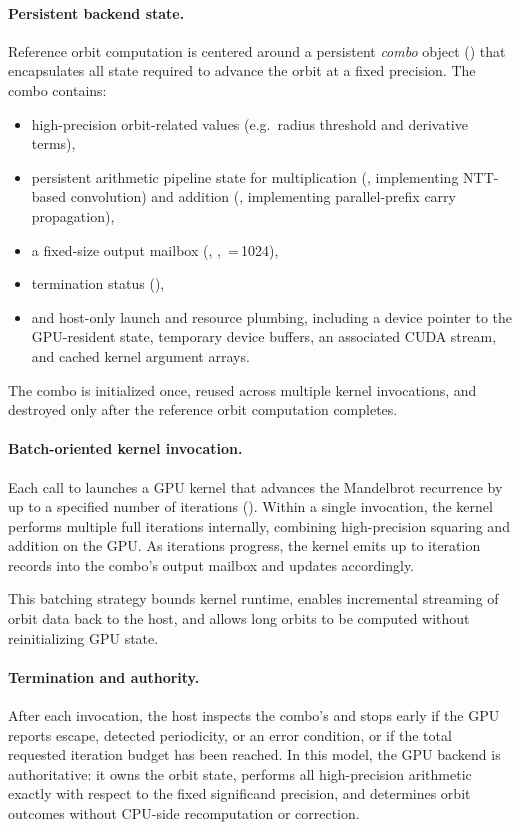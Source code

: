 \paragraph{Persistent backend state.}
Reference orbit computation is centered around a persistent \emph{combo} object
() that encapsulates all state
required to advance the orbit at a fixed precision. The combo contains:
\begin{itemize}
  \item high-precision orbit-related values (e.g.\ radius threshold and derivative terms),
  \item persistent arithmetic pipeline state for multiplication
        (, implementing NTT-based convolution) and
        addition (, implementing parallel-prefix carry
        propagation),
  \item a fixed-size output mailbox (,
        ,
        \,=\,1024),
  \item termination status (),
  \item and host-only launch and resource plumbing, including a device pointer to
        the GPU-resident state, temporary device buffers, an associated CUDA
        stream, and cached kernel argument arrays.
\end{itemize}
The combo is initialized once, reused across multiple kernel invocations, and
destroyed only after the reference orbit computation completes.

\paragraph{Batch-oriented kernel invocation.}
Each call to  launches a GPU kernel that
advances the Mandelbrot recurrence by up to a specified number of iterations
(). Within a single invocation, the kernel performs multiple
full iterations internally, combining high-precision squaring and addition on
the GPU. As iterations progress, the kernel emits up to
 iteration records into the combo’s output mailbox and
updates  accordingly.

This batching strategy bounds kernel runtime, enables incremental streaming of
orbit data back to the host, and allows long orbits to be computed without
reinitializing GPU state.

\paragraph{Termination and authority.}
After each invocation, the host inspects the combo’s 
and stops early if the GPU reports escape, detected periodicity, or an error
condition, or if the total requested iteration budget has been reached. In this
model, the GPU backend is authoritative: it owns the orbit state, performs all
high-precision arithmetic exactly with respect to the fixed significand
precision, and determines orbit outcomes without CPU-side recomputation or
correction.

